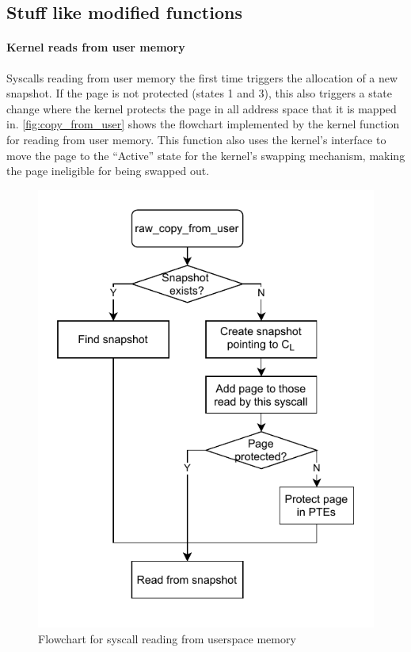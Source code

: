 \documentclass[letterpaper,twocolumn,10pt, anonymous]{article}
\begin{document}
\subsection{Stuff like modified functions}
\paragraph{Kernel reads from user memory}
Syscalls reading from user memory the first time triggers the 
allocation of a new snapshot. 
If the page is not protected (states 1 and 3), this also 
triggers a state change where the kernel protects the page
in all address space that it is mapped in. 
\autoref{fig:copy_from_user} shows the flowchart implemented
by the kernel function  for reading
from user memory.
This function also uses the kernel's  
interface to move the page to the ``Active'' state for the 
kernel's swapping mechanism, making the page ineligible for being 
swapped out.

\begin{figure}[]
  \centering
  \includegraphics[width=0.8\linewidth]{img/copy_from_user.pdf}
  \caption{Flowchart for syscall reading from userspace memory}
  \label{fig:copy_from_user}
\end{figure}
\end{document}
